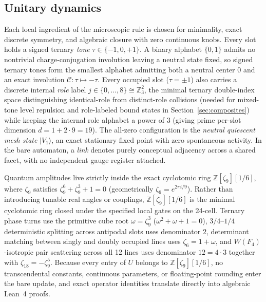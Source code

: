 \subsection{Unitary dynamics}

Each local ingredient of the microscopic rule is chosen for minimality, exact discrete symmetry, and algebraic closure
with zero continuous knobs. Every slot holds a signed ternary \emph{tone} $\tau \in \{-1, 0, +1\}$. A binary alphabet
$\{0, 1\}$ admits no nontrivial charge-conjugation involution leaving a neutral state fixed, so signed ternary tones form
the smallest alphabet admitting both a neutral center $0$ and an exact involution $\mathcal{C} : \tau \mapsto -\tau$.
Every occupied slot ($\tau = \pm 1$) also carries a discrete internal \emph{role} label
$j \in \{0, \dots, 8\} \cong \mathbb{Z}_3^2$, the minimal ternary double-index space distinguishing identical-role from
distinct-role collisions (needed for mixed-tone level repulsion and role-labeled bound states in
Section~\ref{sec:composites}) while keeping the internal role alphabet a power of $3$ (giving prime per-slot dimension
$d = 1 + 2\cdot 9 = 19$). The all-zero configuration is the \emph{neutral quiescent mesh state} $|V_1\rangle$, an exact
stationary fixed point with zero spontaneous activity. In the bare automaton, a \emph{link} denotes purely conceptual
adjacency across a shared facet, with no independent gauge register attached.

Quantum amplitudes live strictly inside the exact cyclotomic ring $\mathbb{Z}[\zeta_9][1/6]$, where $\zeta_9$ satisfies
$\zeta_9^6 + \zeta_9^3 + 1 = 0$ (geometrically $\zeta_9 = e^{2\pi i/9}$). Rather than introducing tunable real angles or
couplings, $\mathbb{Z}[\zeta_9][1/6]$ is the minimal cyclotomic ring closed under the specified local gates on the
24-cell. Ternary phase turns use the primitive cube root $\omega = \zeta_9^3$ ($\omega^2 + \omega + 1 = 0$),
$3/4\text{--}1/4$ deterministic splitting across antipodal slots uses denominator $2$, determinant matching between singly
and doubly occupied lines uses $\zeta_6 = 1 + \omega$, and $W(F_4)$-isotropic pair scattering across all 12 lines uses
denominator $12 = 4 \cdot 3$ together with $\zeta_{18} = -\zeta_9^5$. Because every entry of $U$ belongs to
$\mathbb{Z}[\zeta_9][1/6]$, no transcendental constants, continuous parameters, or floating-point rounding enter the bare
update, and exact operator identities translate directly into algebraic Lean~4 proofs.


